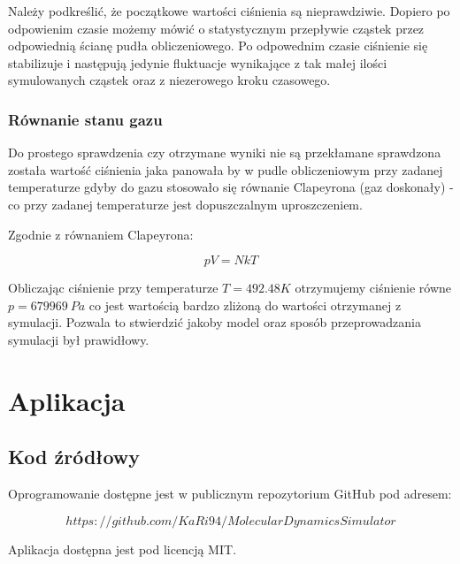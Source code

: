 \documentclass[a4paper,10pt]{article}
\begin{document}
Należy podkreślić, że początkowe wartości ciśnienia są nieprawdziwie. Dopiero po odpowienim czasie możemy mówić o statystycznym przepływie cząstek przez odpowiednią ścianę pudła obliczeniowego. Po odpowednim czasie ciśnienie się stabilizuje i następują jedynie fluktuacje wynikające z tak małej ilości symulowanych cząstek oraz z niezerowego kroku czasowego.

\subsubsection{Równanie stanu gazu}

Do prostego sprawdzenia czy otrzymane wyniki nie są przekłamane sprawdzona została wartość ciśnienia jaka panowała by w pudle obliczeniowym przy zadanej temperaturze gdyby do gazu stosowało się równanie Clapeyrona (gaz doskonały) - co przy zadanej temperaturze jest dopuszczalnym uproszczeniem.

Zgodnie z równaniem Clapeyrona:

\begin{equation}\label{clap}
pV = NkT
\end{equation}

Obliczając ciśnienie przy temperaturze $T=492.48K$ otrzymujemy ciśnienie równe $p = 679969\ Pa$ co jest wartością bardzo zliżoną do wartości otrzymanej z symulacji. Pozwala to stwierdzić jakoby model oraz sposób przeprowadzania symulacji był prawidłowy.


\section{Aplikacja}

\subsection{Kod źródłowy}
Oprogramowanie dostępne jest w publicznym repozytorium GitHub pod adresem\cite{repo}:

$$
https://github.com/KaRi94/MolecularDynamicsSimulator
$$

Aplikacja dostępna jest pod licencją MIT\cite{mit}.
\end{document}
